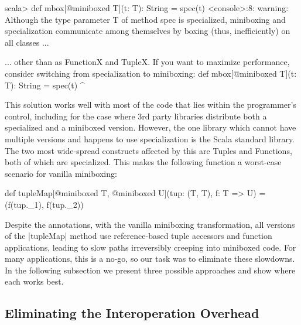 \vspace{-0.05em}

\begin{lstlisting-nobreak-nolang}
scala>  def mbox[@miniboxed T](t: T): String = spec(t)
<console>:8: warning: Although the type parameter T of method spec is specialized, miniboxing and specialization communicate among themselves by boxing (thus, inefficiently) on all classes ...
\end{lstlisting-nobreak-nolang}

\begin{lstlisting-nobreak-nolang}
 ... other than as FunctionX and TupleX. If you want to maximize performance, consider switching from specialization to miniboxing:
        def mbox[@miniboxed T](t: T): String = spec(t)
                                                            ^
\end{lstlisting-nobreak-nolang}

This solution works well with most of the code that lies within the programmer's control, including for the case where 3rd party libraries distribute both a specialized and a miniboxed version. However, the one library which cannot have multiple versions and happens to use specialization is the Scala standard library. The two most wide-spread constructs affected by this are Tuples and Functions, both of which are specialized. This makes the following function a worst-case scenario for vanilla miniboxing:

\begin{lstlisting-nobreak}
 def tupleMap[@miniboxed T,
                  @miniboxed U](tup: (T, T), f: T => U) =
   (f(tup._1), f(tup._2))
\end{lstlisting-nobreak}

Despite the annotations, with the vanilla miniboxing transformation, all versions of the |tupleMap| method use reference-based tuple accessors and function applications, leading to slow paths irreversibly creeping into miniboxed code. For many applications, this is a no-go, so our task was to eliminate these slowdowns. In the following subsection we present three possible approaches and show where each works best.

\vspace{-0.5em}

\subsection{Eliminating the Interoperation Overhead}

